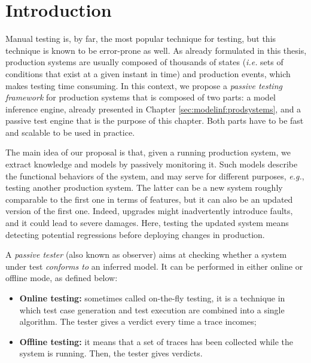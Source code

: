 \section{Introduction}
\label{sec:testing:intro}

Manual testing is, by far, the most popular technique for
testing, but this technique is known to be error-prone as well.
As already formulated in this thesis, production systems are
usually composed of thousands of states (\emph{i.e.} sets of
conditions that exist at a given instant in time) and production
events, which makes testing time consuming.  In this context, we
propose a \emph{passive testing framework} for production systems
that is composed of two parts: a model inference engine, already
presented in Chapter \ref{sec:modelinf:prodsystems}, and a
passive test engine that is the purpose of this chapter. Both
parts have to be fast and scalable to be used in practice.

The main idea of our proposal is that, given a running production
system, we extract knowledge and models by passively monitoring
it. Such models describe the functional behaviors of the system,
and may serve for different purposes, \emph{e.g.}, testing
another production system. The latter can be a new system roughly
comparable to the first one in terms of features, but it can also
be an updated version of the first one. Indeed, upgrades might
inadvertently introduce faults, and it could lead to severe
damages. Here, testing the updated system means detecting
potential regressions before deploying changes in production.

A \textit{passive tester} (also known as observer) aims at
checking whether a system under test \emph{conforms to} an
inferred model. It can be performed in either online or offline
mode, as defined below:

\begin{itemize}
    \item \textbf{Online testing:} sometimes called on-the-fly
        testing, it is a technique in which test case generation
        and test execution are combined into a single algorithm.
        The tester gives a verdict every time a trace incomes;

    \item \textbf{Offline testing:} it means that a set of traces
        has been collected while the system is running. Then, the
        tester gives verdicts.
\end{itemize}

